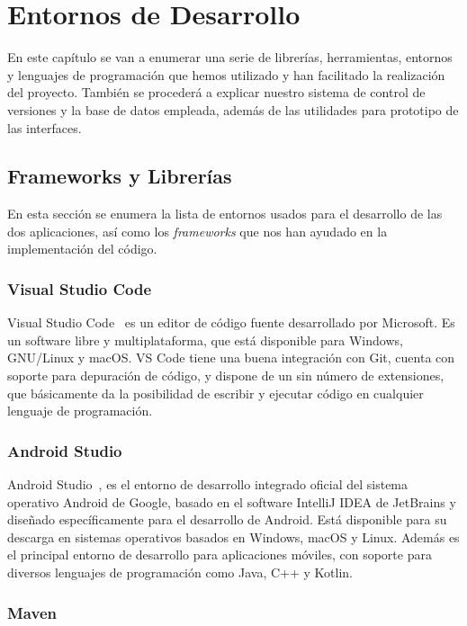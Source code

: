 \chapter{Entornos de Desarrollo}
\label{cap:EntornosDeDesarrollo}
\graphicspath{ {Imagenes/Figuras/} }


En este capítulo se van a enumerar una serie de librerías, herramientas, entornos y lenguajes
de programación que hemos utilizado y han facilitado la realización del proyecto.
También se procederá a explicar nuestro sistema de control de versiones y la base de datos empleada, además de las utilidades para prototipo de las interfaces.

\section{Frameworks y Librerías}
En esta sección se enumera la lista de entornos usados para el desarrollo de las dos aplicaciones, así como los \textit{frameworks} que nos han ayudado en la implementación del código.

\subsection{Visual Studio Code}

Visual Studio Code~\citep{VSCode} es un editor de código fuente desarrollado por Microsoft. Es un software libre y multiplataforma, que está disponible para Windows, GNU/Linux y macOS. VS Code tiene una buena integración con Git, cuenta con soporte para depuración de código, y dispone de un sin número de extensiones, que básicamente da la posibilidad de escribir y ejecutar código en cualquier lenguaje de programación.

\subsection{Android Studio}
Android Studio~\citep{AndroidStudio}, es el entorno de desarrollo integrado oficial del sistema operativo Android de Google, basado en el software IntelliJ IDEA de JetBrains y diseñado específicamente para el desarrollo de Android. Está disponible para su descarga en sistemas operativos basados en Windows, macOS y Linux. Además es el principal entorno de desarrollo para aplicaciones
móviles, con soporte para diversos lenguajes de programación como Java,
C++ y Kotlin.

\subsection{Maven}

